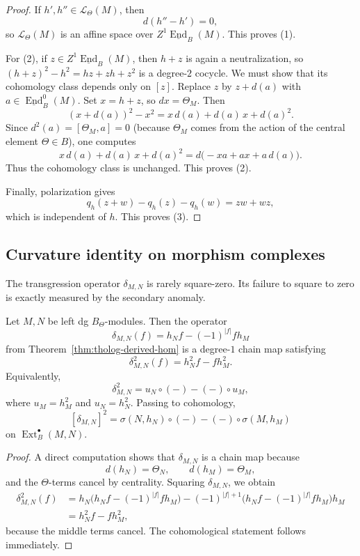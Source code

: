\begin{proof}
If \(h',h''\in \mathcal{L}_{\Theta}(M)\), then
\[
d(h''-h')=0,
\]
so \(\mathcal{L}_{\Theta}(M)\) is an affine space over \(Z^{1}\underline{\operatorname{End}}_{B}(M)\).
This proves (1).

For (2), if \(z\in Z^{1}\underline{\operatorname{End}}_{B}(M)\), then \(h+z\) is again a neutralization, so \((h+z)^{2}-h^{2}=hz+zh+z^{2}\) is a degree-\(2\) cocycle.
We must show that its cohomology class depends only on \([z]\).
Replace \(z\) by \(z+d(a)\) with \(a\in \underline{\operatorname{End}}^{0}_{B}(M)\).
Set \(x=h+z\), so \(dx=\Theta_{M}\).
Then
\[
(x+d(a))^{2}-x^{2}=x\,d(a)+d(a)\,x+d(a)^{2}.
\]
Since \(d^{2}(a)=[\Theta_{M},a]=0\) (because \(\Theta_{M}\) comes from the action of the central element \(\Theta\in B\)), one computes
\[
x\,d(a)+d(a)\,x+d(a)^{2}
=
d\big(-xa+ax+a\,d(a)\big).
\]
Thus the cohomology class is unchanged.
This proves (2).

Finally, polarization gives
\[
q_{h}(z+w)-q_{h}(z)-q_{h}(w)=zw+wz,
\]
which is independent of \(h\).
This proves (3).
\end{proof}

\subsection{Curvature identity on morphism complexes}

The transgression operator \(\delta_{M,N}\) is rarely square-zero.
Its failure to square to zero is exactly measured by the secondary anomaly.

\begin{theorem}
Let \(M,N\) be left dg \(B_{\Theta}\)-modules.
Then the operator
\[
\delta_{M,N}(f)=h_{N}f-(-1)^{|f|}fh_{M}
\]
from Theorem~\ref{thm:tholog-derived-hom} is a degree-\(1\) chain map satisfying
\[
\delta_{M,N}^{2}(f)=h_{N}^{2}f-fh_{M}^{2}.
\]
Equivalently,
\[
\delta_{M,N}^{2}
=
u_{N}\circ(-)-(-)\circ u_{M},
\]
where \(u_{M}=h_{M}^{2}\) and \(u_{N}=h_{N}^{2}\).
Passing to cohomology,
\[
[\delta_{M,N}]^{2}
=
\sigma(N,h_{N})\circ(-)-(-)\circ \sigma(M,h_{M})
\]
on \(\operatorname{Ext}^{\bullet}_{B}(M,N)\).
\end{theorem}

\begin{proof}
A direct computation shows that \(\delta_{M,N}\) is a chain map because
\[
d(h_{N})=\Theta_{N},\qquad d(h_{M})=\Theta_{M},
\]
and the \(\Theta\)-terms cancel by centrality.
Squaring \(\delta_{M,N}\), we obtain
\begin{align*}
\delta_{M,N}^{2}(f)
&=
h_{N}\big(h_{N}f-(-1)^{|f|}fh_{M}\big)
-
(-1)^{|f|+1}\big(h_{N}f-(-1)^{|f|}fh_{M}\big)h_{M}
\\
&=
h_{N}^{2}f-fh_{M}^{2},
\end{align*}
because the middle terms cancel.
The cohomological statement follows immediately.
\end{proof}

